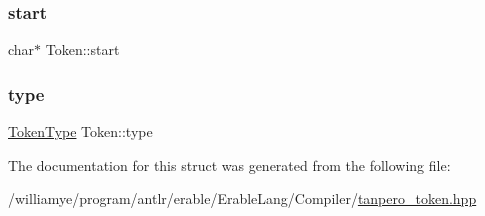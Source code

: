 \subsubsection{\texorpdfstring{start}{start}}
{\footnotesize\ttfamily char$\ast$ Token\+::start}

\mbox{\label{struct_token_a67919af9f3a80dc0b28a0ab1e6d5bf8a}} 
\subsubsection{\texorpdfstring{type}{type}}
{\footnotesize\ttfamily \mbox{\hyperlink{tanpero__token_8hpp_aa520fbf142ba1e7e659590c07da31921}{Token\+Type}} Token\+::type}



The documentation for this struct was generated from the following file\+:\begin{DoxyCompactItemize}
\item 
/williamye/program/antlr/erable/\+Erable\+Lang/\+Compiler/\mbox{\hyperlink{tanpero__token_8hpp}{tanpero\+\_\+token.\+hpp}}\end{DoxyCompactItemize}
